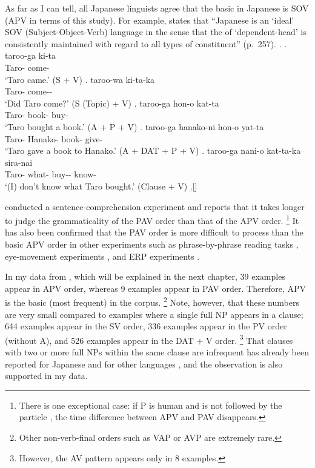 As far as I can tell,
all Japanese linguists agree that
the basic  in Japanese is SOV (APV in terms of this study).
For example,
 states that
``Japanese is an `ideal' SOV (Subject-Object-Verb) language
in the sense that the  of `dependent-head' is consistently maintained with regard to all types of constituent'' (p.~257).
%
\ex.
 \ag. taroo-ga ki-ta \\
      Taro- come- \\
      `Taro came.' \hfill{(S + V)}
 \bg. taroo-wa ki-ta-ka \\
      Taro- come-- \\
      `Did Taro come?'  \hfill{(S (Topic) + V)}
 \bg. taroo-ga hon-o kat-ta \\
      Taro- book- buy- \\
      `Taro bought a book.' \hfill{(A + P + V)}
 \bg. taroo-ga hanako-ni hon-o yat-ta \\
      Taro- Hanako- book- give- \\
      `Taro gave a book to Hanako.' \hfill{(A + DAT + P + V)}
 \bg. taroo-ga nani-o kat-ta-ka sira-nai \\
      Taro- what- buy-- know- \\
      `(I) don't know what Taro bought.'  \hfill{(Clause + V)}
 \b.[]     \hfill{\cite[257--258]{shibatani90}}


 conducted a sentence-comprehension experiment and
reports that it takes longer to judge the grammaticality of the PAV order than that of the APV order.%
 \footnote{
 There is one exceptional case:
 if P is human and is not followed by the particle ,
 the time difference between APV and PAV disappears.
 }
It has also been confirmed that
the PAV order is more difficult to process than the basic APV order 
in other experiments such as
phrase-by-phrase reading tasks \cite{miyamototakahashi02},
eye-movement experiments \cite{mazukaetal02}, and
ERP experiments \cite{uenokluender03}.

In my data from ,
which will be explained in the next chapter,
39 examples appear in APV order,
whereas 9 examples appear in PAV order.
Therefore, APV is the basic (most frequent)  in the corpus.%
 \footnote{
 Other non-verb-final orders such as VAP or AVP are extremely rare.
 }
Note, however, that
these numbers are very small compared to
examples where a single full NP appears in a clause;
644 examples appear in the SV order,
336 examples appear in the PV order (without A), and
526 examples appear in the DAT + V order.%
 \footnote{
 However, the AV pattern appears only in 8 examples.
 }
That clauses with two or more full NPs within the same clause are infrequent
has already been reported for Japanese \cite{matsumoto03} and for other languages \cite{dubois87,dryer97},
and the observation is also supported in my data.



